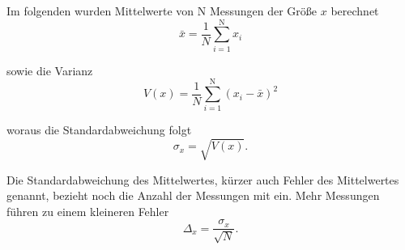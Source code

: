Im folgenden wurden Mittelwerte von N Messungen der Größe $x$ berechnet
\begin {equation}
\bar{x} =  \frac{1}{N} \sum_{i=1}^\text{N} x_i
\end{equation}

sowie die Varianz
\begin {equation}
V(x) = \frac{1}{N} \sum_{i=1}^\text{N} (x_i - \bar{x})^2
\end{equation}

woraus die Standardabweichung folgt
\begin {equation}
\sigma_x = \sqrt{V(x)}.
\end{equation}

Die Standardabweichung des Mittelwertes, kürzer auch Fehler des Mittelwertes genannt, bezieht noch die Anzahl der Messungen mit ein. Mehr Messungen führen zu einem kleineren Fehler
\begin {equation}
\Delta_{x} = \frac{\sigma_x}{\sqrt{N}}.
\end{equation}